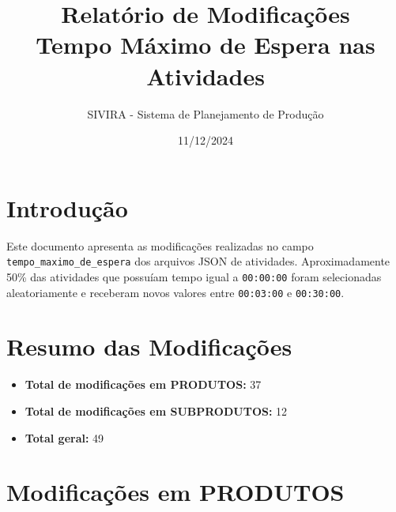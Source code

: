 \documentclass[12pt,a4paper]{article}
\title{\textbf{Relatório de Modificações}\\[0.5cm]
\large Tempo Máximo de Espera nas Atividades}
\author{SIVIRA - Sistema de Planejamento de Produção}
\date{11/12/2024}
\begin{document}
\maketitle

\section{Introdução}

Este documento apresenta as modificações realizadas no campo \texttt{tempo\_maximo\_de\_espera}
dos arquivos JSON de atividades. Aproximadamente 50\% das atividades que possuíam tempo
igual a \texttt{00:00:00} foram selecionadas aleatoriamente e receberam novos valores
entre \texttt{00:03:00} e \texttt{00:30:00}.

\section{Resumo das Modificações}

\begin{itemize}
    \item \textbf{Total de modificações em PRODUTOS:} 37
    \item \textbf{Total de modificações em SUBPRODUTOS:} 12
    \item \textbf{Total geral:} 49
\end{itemize}

\section{Modificações em PRODUTOS}
\end{document}
